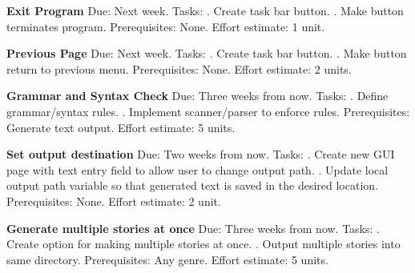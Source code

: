 \documentclass[12pt]{article}
\begin{document}
\textbf{Exit Program}\newline
Due: Next week.
\newline
Tasks: 
. Create task bar button.
. Make button terminates program.
\newline
Prerequisites: None.
\newline
Effort estimate: 1 unit. 

\textbf{Previous Page}\newline
Due: Next week.
\newline
Tasks: 
. Create task bar button.
. Make button return to previous menu.
\newline
Prerequisites: None.
\newline
Effort estimate: 2 units. 

\textbf{Grammar and Syntax Check}\newline
 Due: Three weeks from now.
\newline
Tasks: 
. Define grammar/syntax rules.
. Implement scanner/parser to enforce rules.
\newline
Prerequisites: Generate text output.
\newline
Effort estimate: 5 units. 

\textbf{Set output destination}\newline
Due: Two weeks from now.
\newline
Tasks: 
. Create new GUI page with text entry field to allow user to change output path.
. Update local output path variable so that generated text is saved in the desired location.
\newline
Prerequisites: None.
\newline
Effort estimate: 2 unit. 

\textbf{Generate multiple stories at once}\newline
Due: Three weeks from now.
\newline
Tasks:
. Create option for making multiple stories at once.
. Output multiple stories into same directory.
\newline
Prerequisites: Any genre.
\newline
Effort estimate: 5 units.
\end{document}

